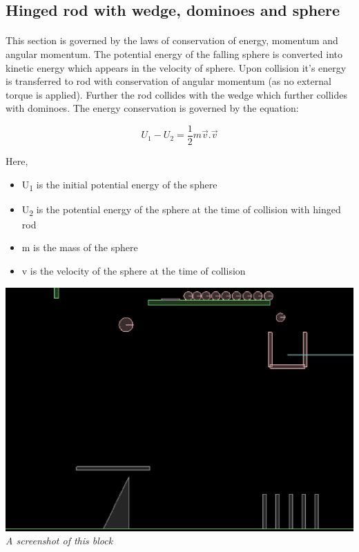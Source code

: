 \documentclass[11pt]{article}
\begin{document}
\subsection{Hinged rod with wedge, dominoes and sphere}
\paragraph{}

	This section is governed by the laws of conservation of energy, momentum and angular momentum.
	The potential energy of the falling sphere is converted into kinetic energy which appears in the 
	velocity of sphere. Upon collision it's energy is transferred to rod with conservation of angular momentum
	(as no external torque is applied).
	Further the rod collides with the wedge which further collides with dominoes.
	The energy conservation is governed by the equation:
	
	\begin{equation}
		U_1 - U_2 = \frac{1}{2}m \vec{v}.\vec{v}
	\end{equation}

Here, 	
\begin{itemize}
\item U\textsubscript{1} is the initial potential energy of the sphere
\item U\textsubscript{2} is the potential energy of the sphere at the time of collision with hinged rod
\item m is the mass of the sphere
\item v is the velocity of the sphere at the time of collision
\end{itemize}

	
\begin{center}
  \includegraphics[scale = 0.4]{ob1} \\
  \emph{A screenshot of this block} \\
\end{center}
\end{document}
